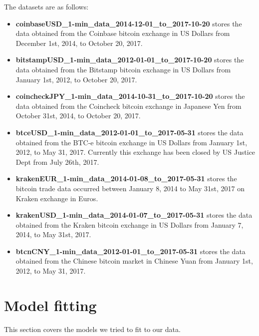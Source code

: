 \documentclass{article}
\begin{document}
The datasets are as follows:
\begin{itemize}
\item \textbf{coinbaseUSD\_1-min\_data\_2014-12-01\_to\_2017-10-20} stores the data obtained from the Coinbase bitcoin exchange in US Dollars from December 1st, 2014, to October 20, 2017.
\item \textbf{bitstampUSD\_1-min\_data\_2012-01-01\_to\_2017-10-20} stores the data obtained from the Bitstamp bitcoin exchange in US Dollars from January 1st, 2012, to October 20, 2017.
\item \textbf{coincheckJPY\_1-min\_data\_2014-10-31\_to\_2017-10-20} stores the data obtained from the Coincheck bitcoin exchange in Japanese Yen from October 31st, 2014, to October 20, 2017.
\item \textbf{btceUSD\_1-min\_data\_2012-01-01\_to\_2017-05-31} stores the data obtained from the BTC-e bitcoin exchange in US Dollars from January 1st, 2012, to May 31, 2017. Currently this exchange has been closed by US Justice Dept from July 26th, 2017.
\item \textbf{krakenEUR\_1-min\_data\_2014-01-08\_to\_2017-05-31}  stores the bitcoin trade data occurred between January 8, 2014 to May 31st, 2017 on Kraken exchange in Euros.
\item \textbf{krakenUSD\_1-min\_data\_2014-01-07\_to\_2017-05-31} stores the data obtained from the Kraken bitcoin exchange in US Dollars from January 7, 2014, to May 31st, 2017.
\item \textbf{btcnCNY\_1-min\_data\_2012-01-01\_to\_2017-05-31} stores the data obtained from the Chinese bitcoin market in Chinese Yuan from January 1st, 2012, to May 31, 2017.
\end{itemize}

\section{Model fitting} \label{secModels}
This section covers the models we tried to fit to our data.
\end{document}

